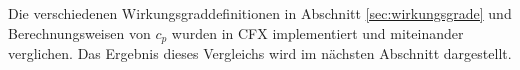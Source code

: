 Die verschiedenen Wirkungsgraddefinitionen in Abschnitt \ref{sec:wirkungsgrade} und Berechnungsweisen von $c_p$ wurden in CFX implementiert und miteinander verglichen. Das Ergebnis dieses Vergleichs wird im nächsten Abschnitt dargestellt.

\begin{comment}
\section{Wirkungsgrade bei der Aachen-Turbine}
\label{sec:wgaachen}
Bei der Aachen-Turbine ergaben sich je nach Berechnungsart folgende Werte für den Wirkungsgrad:
\begin{table}[H]
\centering
\caption{Wirkungsgrad bei der Aachen-Turbine}
\begin{tabular}{ c| c}
Berechnungsformel & $\eta$ \\
\hline
$\eta_{\Delta T_t}$ mit $c_p$ konstant& 86\% \\
$\eta_{\Delta T_t}$ mit $c_p(T)$& 86\% \\
$\eta_{\Delta h_t}$& 87\% \\
$\eta_{torque}$& 85\% \\
\end{tabular}
\label{tab:wgaachen}
\end{table}
Es ist zu sehen, dass .....
\todo
\end{comment}






